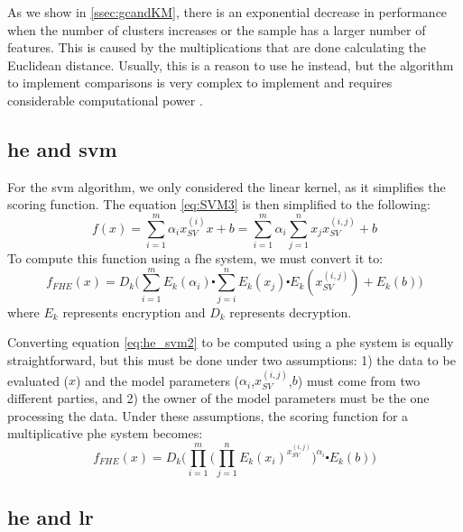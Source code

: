 As we show in \ref{ssec:gcandKM}, there is an exponential decrease in performance when the number of clusters increases or the sample has a larger number of features. This is caused by the multiplications that are done calculating the Euclidean distance. Usually, this is a reason to use \ac{he} instead, but the algorithm to implement comparisons is very complex to implement and requires considerable computational power \cite{blake2004strong}.



\subsection{\acl{he} and \acl{svm}}
\label{ssec:HEandSVM}

For the \ac{svm} algorithm, we only considered the linear kernel, as it simplifies the scoring function. The equation \ref{eq:SVM3} is then simplified to the following:
\begin{equation}
\label{eq:he_svm1}
f(x)=\sum_{i=1}^m \alpha_i x_{SV}^{(i)}x+b = \sum_{i=1}^m \alpha_i \sum_{j=1}^n x_j x_{SV}^{(i,j)} + b
\end{equation}
To compute this function using a \ac{fhe} system, we must convert it to:
\begin{equation}
\label{eq:he_svm2}
f_{FHE}(x) = D_k\Bigg( \sum_{i=1}^m E_k(\alpha_i) \centerdot \sum_{j=i}^n E_k(x_j) \centerdot E_k(x_{SV}^{(i,j)}) + E_k(b)\Bigg)
\end{equation}
where $E_k$ represents encryption and $D_k$ represents decryption.

Converting equation \ref{eq:he_svm2} to be computed using a \ac{phe} system is equally straightforward, but this must be done under two assumptions: 1) the data to be evaluated ($x$) and the model parameters ($\alpha_i$,$x_{SV}^{(i,j)}$,$b$) must come from two different parties, and 2) the owner of the model parameters must be the one processing the data. Under these assumptions, the scoring function for a multiplicative \ac{phe} system becomes:
\begin{equation}
\label{eq:he_svm3}
f_{FHE}(x) = D_k\Bigg( \prod_{i=1}^m \bigg(\prod_{j=1}^n E_k(x_i)^{x_{SV}^{(i,j)}} \bigg)^{\alpha_i} \centerdot E_k(b) \Bigg)
\end{equation}

\subsection{\acl{he} and \acl{lr}}
\label{ssec:HEandLR}

